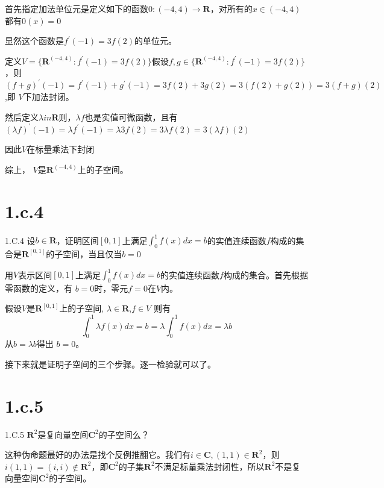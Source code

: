 \documentclass[10pt,a4paper,UTF8]{article}
\begin{document}
\begin{answer}
首先指定加法单位元是定义如下的函数\(0:(-4,4)\rightarrow \mathbf{R}\)，对所有的\(x\in (-4,4)\)都有\(0(x) = 0\)

显然这个函数是\(f^{'}(-1) = 3f(2)\)的单位元。

定义\(V= \{ \mathbf{R}^{(-4,4)}: f^{'}(-1) = 3f(2)\}\)假设\(f,g\in \{ \mathbf{R}^{(-4,4)}: f^{'}(-1) = 3f(2)\}\)，则\((f+g)^{'}(-1) = f^{'}(-1) + g^{'}(-1) = 3f(2) + 3g(2) = 3 (f(2) + g(2)) = 3(f+g)(2)\),即 \(V\)下加法封闭。

然后定义\(\lambda in \mathbf{R}\)则，\(\lambda f\)也是实值可微函数，且有\((\lambda f)^{'}(-1) = \lambda f^{'}(-1) = \lambda 3 f(2) = 3 \lambda f(2) = 3 (\lambda f)(2)\) 

因此\(V\)在标量乘法下封闭

综上， \(V\)是\(\mathbf{R}^{(-4,4)}\)上的子空间。
\end{answer}
\section*{1.c.4}
\label{sec:org9a1bb3e}


\begin{problem}
1.C.4 设\(b\in \mathbf{R}\)，证明区间\([0,1]\)上满足\(\int_{0}^{1}f(x)dx = b\)的实值连续函数\(f\)构成的集合是\(\mathbf{R}^{[0,1]}\)的子空间，当且仅当\(b=0\)
\end{problem}

\begin{answer}
用\(V\)表示区间\([0,1]\)上满足\(\int_{0}^{1}f(x)dx = b\)的实值连续函数\(f\)构成的集合。首先根据零函数的定义，有 \(b=0\)时，零元\(f=0\)在\(V\)内。

假设\(V\)是\(\mathbf{R}^{[0,1]}\)上的子空间, \(\lambda \in \mathbf{R}\),\(f\in V\) 则有
\[\int_{0}^{1}\lambda f(x) dx = b =\lambda \int_{0}^{1} f(x)dx = \lambda b\]
从\(b = \lambda b\)得出 \(b=0\)。

接下来就是证明子空间的三个步骤。逐一检验就可以了。
\end{answer}
\section*{1.c.5}
\label{sec:orgac44cfa}


\begin{problem}
1.C.5 \(\mathbf{R}^{2}\)是复向量空间\(\mathbf{C}^{2}\)的子空间么？
\end{problem}
\begin{answer}
这种伪命题最好的办法是找个反例推翻它。我们有\(i \in \mathbf{C},(1,1)\in \mathbf{R}^{2}\)，则\(i(1,1) = (i,i)\notin \mathbf{R}^{2}\)，即\(\mathbf{C}^{2}\)的子集\(\mathbf{R}^{2}\)不满足标量乘法封闭性，所以\(\mathbf{R}^{2}\)不是复向量空间\(\mathbf{C}^{2}\)的子空间。
\end{answer}
\end{document}
